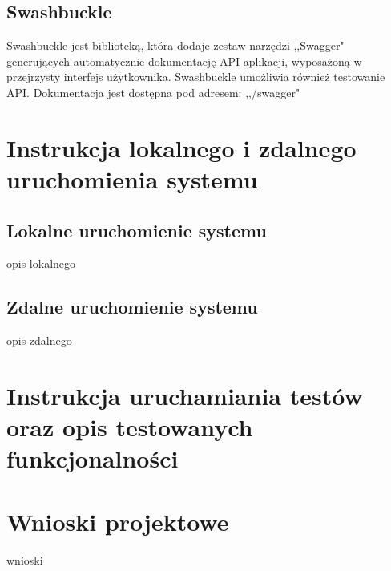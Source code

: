 \documentclass[12pt,a4paper]{article}
\begin{document}
		\subsection{Swashbuckle}
			\indent Swashbuckle jest biblioteką, która dodaje zestaw narzędzi ,,Swagger" generujących automatycznie dokumentację API aplikacji,
				wyposażoną w przejrzysty interfejs użytkownika. Swashbuckle umożliwia również testowanie API. Dokumentacja jest dostępna pod adresem: ,,/swagger"

	\newpage
		
	\section{Instrukcja lokalnego i zdalnego uruchomienia systemu}
		\subsection{Lokalne uruchomienie systemu}
			\indent opis lokalnego
			
		\subsection{Zdalne uruchomienie systemu}
			\indent opis zdalnego

	\newpage
	
	\section{Instrukcja uruchamiania testów oraz opis testowanych funkcjonalności}

	\newpage

	\section{Wnioski projektowe}
		\indent wnioski		
\end{document}
